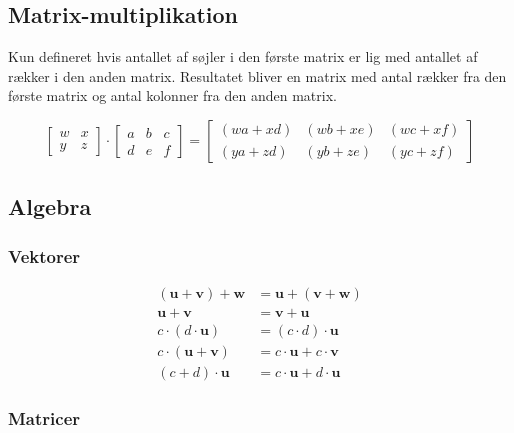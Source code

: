 \subsection{Matrix-multiplikation}
Kun defineret hvis antallet af søjler i den første matrix er lig med antallet af rækker i den anden matrix. Resultatet bliver en matrix med antal rækker fra den første matrix og antal kolonner fra den anden matrix.

\[
    \begin{bmatrix}
        w & x \\
        y & z
    \end{bmatrix}
    \cdot
    \begin{bmatrix}
        a & b & c \\
        d & e & f
    \end{bmatrix}
    =
    \begin{bmatrix}
        (wa + xd) & (wb + xe) & (wc + xf) \\
        (ya + zd) & (yb + ze) & (yc + zf)
    \end{bmatrix}
\]



\subsection{Algebra}
\subsubsection{Vektorer}
\begin{align*}
    (\mathbf{u} + \mathbf{v}) + \mathbf{w} &= \mathbf{u} + (\mathbf{v} + \mathbf{w}) \\
    \mathbf{u} + \mathbf{v} &= \mathbf{v} + \mathbf{u} \\
    c \cdot (d \cdot \mathbf{u}) &= (c \cdot d) \cdot \mathbf{u} \\
    c \cdot (\mathbf{u} + \mathbf{v}) &= c \cdot \mathbf{u} + c \cdot \mathbf{v} \\
    (c + d) \cdot \mathbf{u} &= c \cdot \mathbf{u} + d \cdot \mathbf{u}
\end{align*}

\subsubsection{Matricer}


